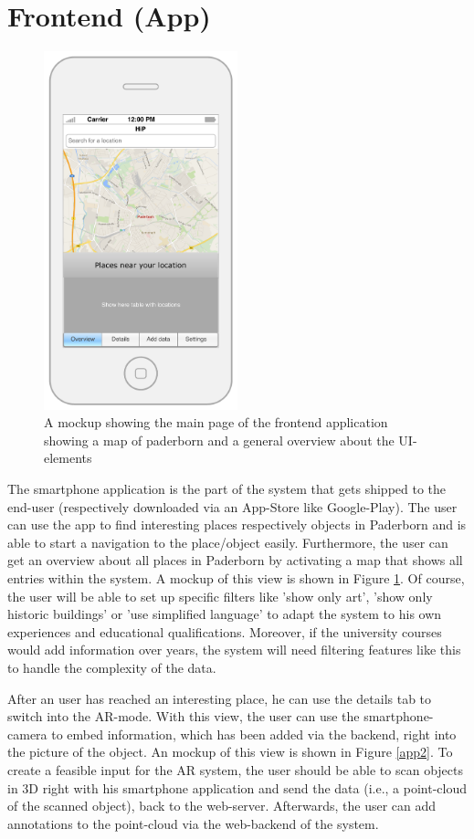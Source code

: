\section{Frontend (App)}
\begin{figure}[th]
\centerline{\includegraphics[width=0.5\textwidth]{gfx/mockup_app_1}}
\caption{A mockup showing the main page of the frontend application showing a map of paderborn and a general overview about the UI-elements}
\label{app1}
\end{figure}

The smartphone application is the part of the system that gets shipped to the end-user (respectively downloaded via an App-Store like Google-Play). The user can use the app to find interesting places respectively objects in Paderborn and is able to start a navigation to the place/object easily. Furthermore, the user can get an overview about all places in Paderborn by activating a map that shows all entries within the system. A mockup of this view is shown in Figure \ref{app1}. Of course, the user will be able to set up specific filters like 'show only art', 'show only historic buildings' or 'use simplified language' to adapt the system to his own experiences and educational qualifications. Moreover, if the university courses would add information over years, the system will need filtering features like this to handle the complexity of the data.

After an user has reached an interesting place, he can use the details tab to switch into the \ac{AR}-mode. With this view, the user can use the smartphone-camera to embed information, which has been added via the backend, right into the picture of the object. An mockup of this view is shown in Figure \ref{app2}. 
To create a feasible input for the \ac{AR} system, the user should be able to scan objects in 3D right with his smartphone application and send the data (i.e., a point-cloud of the scanned object), back to the web-server.  Afterwards, the user can add annotations to the point-cloud via the web-backend of the system.  

